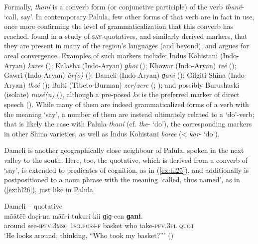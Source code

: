 \documentclass[output=paper]{langsci/langscibook}
\begin{document}
Formally, \textit{thaní} is a converb form (or conjunctive participle) of the verb \textit{thané}- ‘call, say’. In contemporary Palula, few other forms of that verb are in fact in use, once more confirming the level of grammaticalization that this converb has reached. \cite{Bashir1996a} found in a study of \textsc{say}-quotatives, and similarly derived markers, that they are present in many of the region’s languages (and beyond), and argues for areal convergence. Examples of such markers include: Indus Kohistani (Indo-Aryan) \textit{karee} (\citealt[67--69]{Lubberger2014}); Kalasha (Indo-Aryan) \textit{ɡhõi} (\citealt[67]{Heegard2015}); Khowar (Indo-Aryan) \textit{reé} (\citealt[225--235]{Bashir1996a}); Gawri (Indo-Aryan) \textit{är(o)} (\citealt[147--149]{Baart1999}); Dameli (Indo-Aryan) \textit{ɡani} (\citealt[176--177]{Perder2013}); Gilgiti Shina (Indo-Aryan) \textit{theé} (\citealt[28]{RadloffShakil1998}); Balti (Tibeto-Burman) \textit{zer}/\textit{zere} (\citealt[270]{Bashir1996a}; \citealt[64]{Jones2009a}); and possibly Burushaski (isolate) \textit{nusé(n)} (\citealt[262]{Bashir1996a}), although a pre-posed \textit{ke} is the preferred marker of direct speech (\citealt[193]{Berger1998}). While many of them are indeed grammaticalized forms of a verb with the meaning ‘say’, a number of them are instead ultimately related to a ‘do’-verb; that is likely the case with Palula \textit{thaní} (cf. \textit{the}- ‘do’), the corresponding markers in other Shina varieties, as well as Indus Kohistani \textit{karee} (< \textit{kar}- ‘do’).
 
Dameli is another geographically close neighbour of Palula, spoken in the next valley to the south. Here, too, the quotative, which is derived from a converb of ‘say’, is extended to predicates of cognition, as in ‎(\ref{ex:hl25}), and additionally is postpositioned to a noun phrase with the meaning ‘called, thus named’, as in ‎(\ref{ex:hl26}), just like in Palula. 

\begin{exe}
\ex Dameli -- quotative \label{ex:hl25}\\
	\gll mããtẽẽ dac̣i-na mãã-i tukuri kii ɡiɡ-een \textbf{ɡani}.\\
	around see-\textsc{ipfv}.3\textsc{msg} 1\textsc{sg}.\textsc{poss}-\textsc{f} basket who take-\textsc{pfv}.3\textsc{pl} \textsc{quot}\\
	\trans ‘He looks around, thinking, “Who took my basket?”’ (\citealt[176]{Perder2013}) 
\end{exe}
\end{document}
